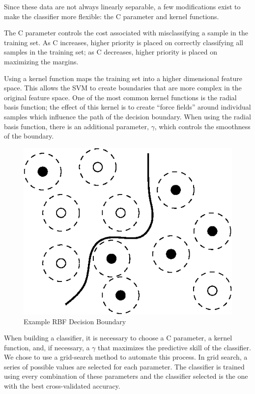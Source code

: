 \documentclass[12pt]{article}
\begin{document}
Since these data are not always linearly separable, a few modifications exist to make the classifier more flexible: the C parameter and kernel functions. 

The C parameter controls the cost associated with misclassifying a sample in the training set. As C increases, higher priority is placed on correctly classifying all samples in the training set; as C decreases, higher priority is placed on maximizing the margins.

Using a kernel function maps the training set into a higher dimensional feature space. This allows the SVM to create boundaries that are more complex in the original feature space. One of the most common kernel functions is the radial basis function; the effect of this kernel is to create “force fields” around individual samples which influence the path of the decision boundary. When using the radial basis function, there is an additional parameter, \(\gamma\), which controls the smoothness of the boundary.

\begin{figure}[h]
  \centering
  \includegraphics[scale=1]{rbf}
  \caption{Example RBF Decision Boundary}
  \label{fig:RBF}
\end{figure}

When building a classifier, it is necessary to choose a C parameter, a kernel function, and, if necessary, a \(\gamma\) that maximizes the predictive skill of the classifier. We chose to use a grid-search method to automate this process. In grid search, a series of possible values are selected for each parameter. The classifier is trained using every combination of these parameters and the classifier selected is the one with the best cross-validated accuracy. 
\end{document}
